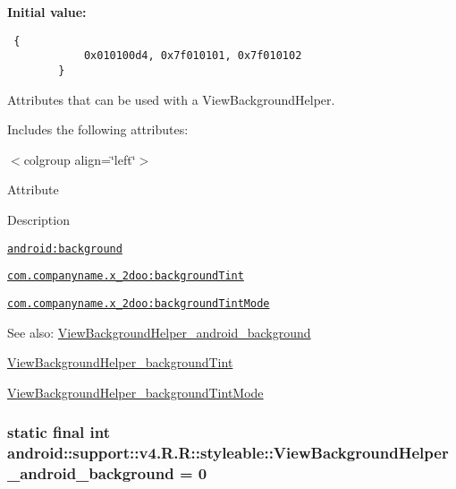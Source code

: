 \textbf{Initial value:}

\begin{Code}\begin{verbatim} {
            0x010100d4, 0x7f010101, 0x7f010102
        }
\end{verbatim}
\end{Code}
Attributes that can be used with a ViewBackgroundHelper. 

Includes the following attributes: \begin{TabularC}{0}
\hline
\end{TabularC}
$<$colgroup align=\char`\"{}left\char`\"{}$>$ 

Attribute

Description 

{\tt \hyperlink{classandroid_1_1support_1_1v4_1_1_r_1_1styleable_d1d939ab4db138508ef554b91d462b56}{android:background}}

{\tt \hyperlink{classandroid_1_1support_1_1v4_1_1_r_1_1styleable_2909631ff949ac1d62e73fab3d3f3657}{com.companyname.x\_\-2doo:backgroundTint}}

{\tt \hyperlink{classandroid_1_1support_1_1v4_1_1_r_1_1styleable_ce8b167b299fb0cf05509b92a60b8d04}{com.companyname.x\_\-2doo:backgroundTintMode}}

\begin{Desc}
\item[See also:]\hyperlink{classandroid_1_1support_1_1v4_1_1_r_1_1styleable_d1d939ab4db138508ef554b91d462b56}{ViewBackgroundHelper\_\-android\_\-background} 

\hyperlink{classandroid_1_1support_1_1v4_1_1_r_1_1styleable_2909631ff949ac1d62e73fab3d3f3657}{ViewBackgroundHelper\_\-backgroundTint} 

\hyperlink{classandroid_1_1support_1_1v4_1_1_r_1_1styleable_ce8b167b299fb0cf05509b92a60b8d04}{ViewBackgroundHelper\_\-backgroundTintMode} \end{Desc}
\hypertarget{classandroid_1_1support_1_1v4_1_1_r_1_1styleable_d1d939ab4db138508ef554b91d462b56}{
\subsubsection[{ViewBackgroundHelper\_\-android\_\-background}]{\setlength{\rightskip}{0pt plus 5cm}static final int android::support::v4.R.R::styleable::ViewBackgroundHelper\_\-android\_\-background = 0}}
\label{classandroid_1_1support_1_1v4_1_1_r_1_1styleable_d1d939ab4db138508ef554b91d462b56}


